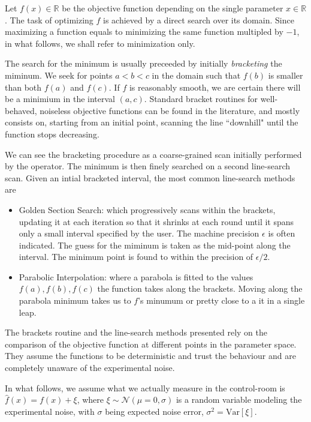 Let $f(x)\in\mathbb{R}$ be the objective function depending on the single parameter $x\in\mathbb{R}$. The task of optimizing $f$ is achieved by a direct search over its domain. Since maximizing a function equals to minimizing the same function multipled by $-1$, in what follows, we shall refer to minimization only.

The search for the minimum is usually preceeded by initially \textit{bracketing} the miminum. We seek for points $a<b<c$ in the domain such that $f(b)$ is smaller than both $f(a)$ and $f(c)$. If $f$ is reasonably smooth, we are certain there will be a minimium in the interval $(a, c)$. Standard bracket routines for well-behaved, noiseless objective functions can be found in the literature, and mostly consists on, starting from an initial point, scanning the line ``downhill" until the function stops decreasing.

We can see the bracketing procedure as a coarse-grained scan initially performed by the operator. The minimum is then finely searched on a second line-search scan. Given an intial bracketed interval, the most common line-search methods are
\begin{itemize}
    \item Golden Section Search: which progressively scans within the brackets, updating it at each iteration so that it shrinks at each round until it spans only a small interval specified by the user. The machine precision $\epsilon$ is often indicated. The guess for the miminum is taken as the mid-point along the interval. The minimum point is found to within the precision of $\epsilon/2$.
    \item Parabolic Interpolation: where a parabola is fitted to the values $f(a), f(b), f(c)$ the function takes along the brackets. Moving along the parabola minimum takes us to $f$'s minumum or pretty close to a it in a single leap.
\end{itemize}

The brackets routine and the line-search methods presented rely on the comparison of the objective function at different points in the parameter space. They assume the functions to be deterministic and trust the behaviour and are completely unaware of the experimental noise.

In what follows, we assume what we actually measure in the control-room is $\hat{f}(x)=f(x) + \xi$, where $\xi\sim\mathcal{N}(\mu=0, \sigma)$ is a random variable modeling the experimental noise, with $\sigma$ being expected noise error, $\sigma^2 = \text{Var}[\xi]$.

